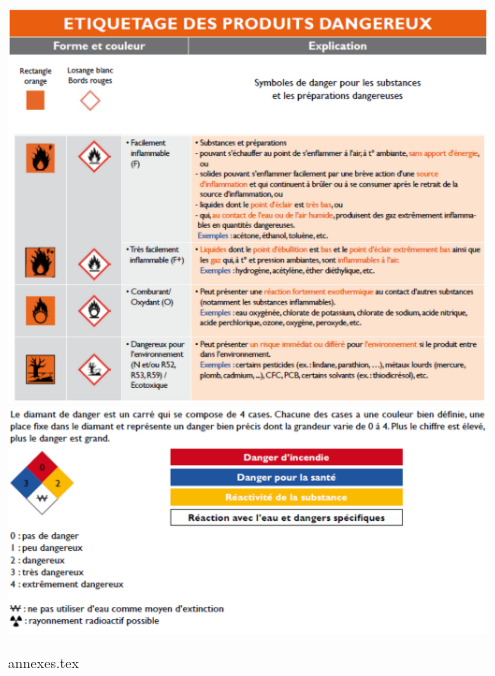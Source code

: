 \documentclass[a4paper]{article}
\begin{document}
\begin{center}
\includegraphics[width=0.95\textwidth]{images/signaux7.PNG}
\includegraphics[width=0.95\textwidth]{images/signaux8.PNG}
\end{center}















\appendix \newpage















{annexes.tex}
\end{document}
